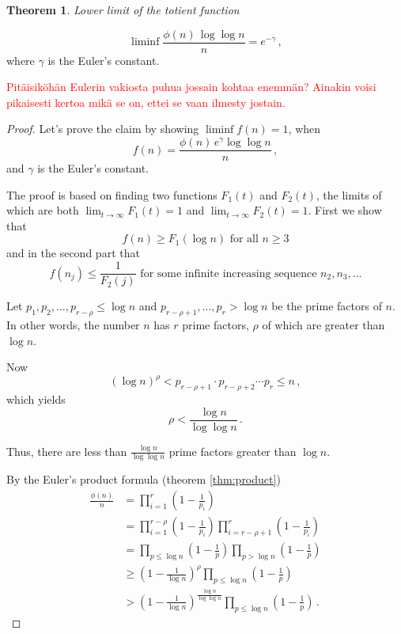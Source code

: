 \documentclass{article}
\theoremstyle{definition}
\newtheorem{theorem}[subsubsection]{Theorem}
\begin{document}
\begin{theorem}{\emph{Lower limit of the totient function}}

\begin{equation*}
    \liminf{\frac{\phi(n)\,\log\log n}{n}}=e^{-\gamma}\,,
\end{equation*}
where $\gamma$ is the Euler's constant.

\textcolor{red}{Pitäisiköhän Eulerin vakiosta puhua jossain kohtaa enemmän? Ainakin voisi pikaisesti kertoa mikä se on, ettei se vaan ilmesty jostain.}

\begin{proof}

Let's prove the claim by showing $\liminf{f(n)} = 1$, when
\begin{equation*}
    f(n)= \frac{\phi(n)\,e^\gamma \log\log n}{n}\,,
\end{equation*}
and $\gamma$ is the Euler's constant.

The proof is based on finding two functions $F_1(t)$ and $F_2(t)$, the limits of which are both $\lim_{t\rightarrow \infty} F_1(t) = 1$ and $\lim_{t\rightarrow \infty} F_2(t) = 1$. First we show that 
\begin{equation}
\label{eq:first}
    f(n) \geq F_1(\log n)\text{ for all }n\geq 3
\end{equation}
and in the second part that
\begin{equation}
\label{eq:second}
    f(n_j) \leq \frac{1}{F_2(j)}\text{ for some infinite increasing sequence }n_2, n_3,...
\end{equation}

Let $p_1,p_2,...,p_{r-\rho} \leq \log n$ and $p_{r-\rho+1},...,p_r > \log n$ be the prime factors of $n$. In other words, the number $n$ has $r$ prime factors, $\rho$ of which are greater than $\log n$.

Now
\begin{equation*}
    (\log n)^\rho < p_{r-\rho+1} \cdot p_{r-\rho+2} \cdots p_r \leq n\,,
\end{equation*}
which yields
\begin{equation*}
    \rho < \frac{\log n}{\log\log n}\,.
\end{equation*}

Thus, there are less than $\frac{\log n}{\log\log n}$ prime factors greater than $\log n$.

By the Euler's product formula (theorem \ref{thm:product})
\begin{align*}
    \frac{\phi(n)}{n} & = \prod_{i=1}^r\left(1-\frac{1}{p_i}\right)\\
    & = \prod_{i=1}^{r-\rho}\left(1-\frac{1}{p_i}\right) \prod_{i=r-\rho+1}^r\left(1-\frac{1}{p_i}\right)\\
    & = \prod_{p\leq\log n}\left(1-\frac{1}{p}\right) \prod_{p>\log n}\left(1-\frac{1}{p}\right)\\
    & \geq \left(1-\frac{1}{\log n}\right)^\rho \prod_{p\leq\log n}\left(1-\frac{1}{p}\right) \\
    & > \left(1-\frac{1}{\log n}\right)^\frac{\log n}{\log \log n} \prod_{p\leq\log n}\left(1-\frac{1}{p}\right)\,.
\end{align*}


\end{proof}
\end{theorem}
\end{document}
